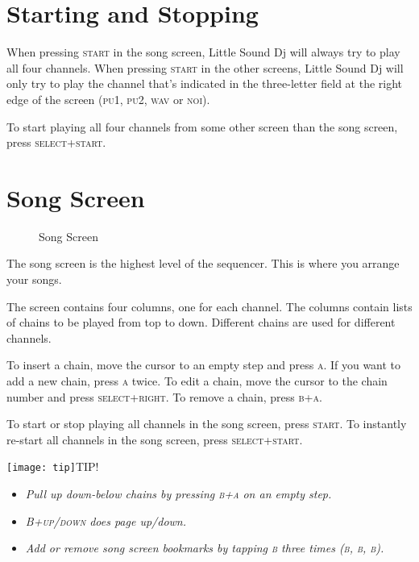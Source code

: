 \section{Starting and Stopping}

When pressing \textsc{start} in the song screen, Little Sound Dj will always try to play all four
channels. When pressing \textsc{start} in the other screens, Little Sound Dj will only try to play the
channel that's indicated in the three-letter field at the right edge of the screen (\textsc{pu1}, \textsc{pu2}, \textsc{wav} or \textsc{noi}).

To start playing all four channels from some other screen than the song screen,
press \textsc{select+start}.

\section{Song Screen}

\begin{figure}[hbtp]
\centering
{}
\caption{Song Screen}
\end{figure}

The song screen
is the highest level of the sequencer. This is where you arrange your songs.

The screen contains four columns, one for each channel. The columns contain lists of chains to be played from top to down. Different chains are used for different channels.

To insert a chain, move the cursor to an empty step and press \textsc{a}. If you want to add a new
chain, press \textsc{a} twice. To edit a chain, move the cursor to the chain number and press
\textsc{select+right}. To remove a chain, press \textsc{b+a}.

To start or stop playing all channels in the song screen, press \textsc{start}. To instantly re-start all channels in the song screen, press \textsc{select+start}.

\texttt{[image: tip]}TIP!
\begin{itemize}
\item \textit{Pull up down-below chains by pressing \textsc{b+a} on an empty step.}
\item \textit{\textsc{B+up/down} does page up/down.}
\item \textit{Add or remove song screen bookmarks by tapping \textsc{b} three times \textsc{(b, b, b)}.}
\end{itemize}

